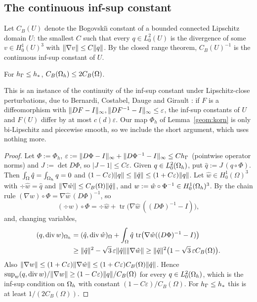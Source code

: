 \subsection{The continuous inf-sup constant}
Let $C_B(U)$ denote the Bogovski\u{\i} constant of a bounded connected Lipschitz domain $U$: the smallest $C$ such that every $q\in L^2_0(U)$ is the divergence of some $v\in H^1_0(U)^3$ with $\lVert \nabla v\rVert\le C\lVert q\rVert$. By the closed range theorem, $C_B(U)^{-1}$ is the continuous inf-sup constant of $U$.

\begin{lemma}\label{st:bog}
For $h_\Gamma\le h_\ast$, $C_B(\Omega_h)\le2C_B(\Omega)$.
\end{lemma}

This is an instance of the continuity of the inf-sup constant under Lipschitz-close perturbations, due to Bernardi, Costabel, Dauge and Girault \cite[Theorem~4.4]{BCDG2016}: if $F$ is a diffeomorphism with $\lVert DF-I\rVert_\infty,\lVert DF^{-1}-I\rVert_\infty\le\varepsilon$, the inf-sup constants of $U$ and $F(U)$ differ by at most $c(d)\varepsilon$. Our map $\Phi_h$ of Lemma~\ref{geom:korn} is only bi-Lipschitz and piecewise smooth, so we include the short argument, which uses nothing more.

\begin{proof}
Let $\Phi:=\Phi_h$, $\varepsilon:=\lVert D\Phi-I\rVert_\infty+\lVert D\Phi^{-1}-I\rVert_\infty\le Ch_\Gamma$ (pointwise operator norms) and $J:=\det D\Phi$, so $|J-1|\le C\varepsilon$. Given $q\in L^2_0(\Omega_h)$, put $\hat q:=J\,(q\circ\Phi)$. Then $\int_\Omega\hat q=\int_{\Omega_h}q=0$ and $(1-C\varepsilon)\lVert q\rVert\le\lVert \hat q\rVert\le(1+C\varepsilon)\lVert q\rVert$. Let $\hat w\in H^1_0(\Omega)^3$ with $\div\hat w=\hat q$ and $\lVert \nabla\hat w\rVert\le C_B(\Omega)\lVert \hat q\rVert$, and $w:=\hat w\circ\Phi^{-1}\in H^1_0(\Omega_h)^3$. By the chain rule $(\nabla w)\circ\Phi=\nabla\hat w\,(D\Phi)^{-1}$, so
\[
(\div w)\circ\Phi=\div\hat w+\operatorname{tr}\bigl(\nabla\hat w\,((D\Phi)^{-1}-I)\bigr),
\]
and, changing variables,
\begin{align*}
(q,\operatorname{div} w)_{\Omega_h}&=(\hat q,\operatorname{div}\hat w)_\Omega+\int_\Omega\hat q\,\operatorname{tr}\bigl(\nabla\hat w((D\Phi)^{-1}-I)\bigr)\\
&\ge\lVert \hat q\rVert^2-\sqrt3\,\varepsilon\lVert \hat q\rVert\lVert \nabla\hat w\rVert\ge\lVert \hat q\rVert^2\bigl(1-\sqrt3\,\varepsilon C_B(\Omega)\bigr).
\end{align*}
Also $\lVert \nabla w\rVert\le(1+C\varepsilon)\lVert \nabla\hat w\rVert\le(1+C\varepsilon)C_B(\Omega)\lVert \hat q\rVert$. Hence $\sup_w(q,\operatorname{div} w)/\lVert \nabla w\rVert\ge(1-C\varepsilon)\lVert q\rVert/C_B(\Omega)$ for every $q\in L^2_0(\Omega_h)$, which is the inf-sup condition on $\Omega_h$ with constant $(1-C\varepsilon)/C_B(\Omega)$. For $h_\Gamma\le h_\ast$ this is at least $1/(2C_B(\Omega))$.
\end{proof}

